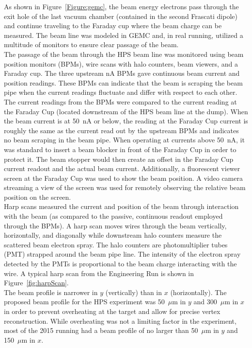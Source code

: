 \indent As shown in Figure~\ref{Figure:gemc}, the beam energy electrons pass through the exit hole of the last vacuum chamber (contained in the second Frascati dipole) and continue traveling to the Faraday cup where the beam charge can be measured. The beam line was modeled in GEMC and, in real running, utilized a multitude of monitors to ensure clear passage of the beam.\\
\indent The passage of the beam through the HPS beam line was monitored using beam position monitors (BPMs), wire scans with halo counters, beam viewers, and a Faraday cup. The three upstream nA BPMs gave continuous beam current and position readings. These BPMs can indicate that the beam is scraping the beam pipe when the current readings fluctuate and differ with respect to each other. The current readings from the BPMs were compared to the current reading at the Faraday Cup (located downstream of the HPS beam line at the dump). When the beam current is at 50~nA or below, the reading at the Faraday Cup current is roughly the same as the current read out by the upstream BPMs and indicates no beam scraping in the beam pipe. When operating at currents above 50~nA, it was standard to insert a beam blocker in front of the Faraday Cup in order to protect it. The beam stopper would then create an offset in the Faraday Cup current readout and the actual beam current. Additionally, a fluorescent viewer screen at the Faraday Cup was used to show the beam position.  A video camera streaming a view of the screen was used for remotely observing the relative beam position on the screen. \\ 
\indent Harp scans measured the current and position of the beam through interaction with the beam (as compared to the passive, continuous readout employed through the BPMs). A harp scan moves wires through the beam vertically, horizontally, and diagonally while  downstream halo counters measure the scattered beam electron spray. The halo counters are photomultiplier tubes (PMT) strapped around the beam pipe line. The intensity of the electron spray detected by the PMTs is proportional to the beam charge interacting with the wire. A typical harp scan from the Engineering Run is shown in Figure~\ref{fig:harpScan}.\\
\indent The beam profile is narrower in $y$ (vertically) than in $x$ (horizontally). The proposed beam profile for the HPS experiment was 50~$\mu$m in $y$ and 300~$\mu$m in $x$ in order to prevent overheating at the target and allow for precise vertex reconstruction. While overheating was not a limiting factor in the experiment, most of the 2015 running had a beam profile of no larger than 50~$\mu$m in $y$ and 150~$\mu$m in $x$. 

